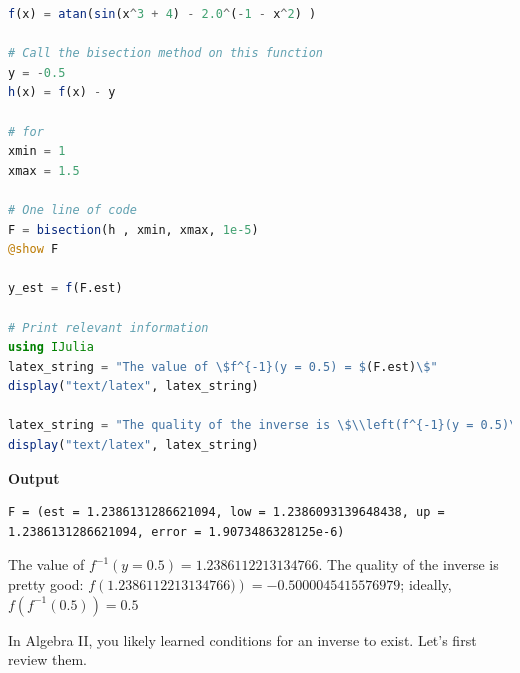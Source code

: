 \bigskip 

\begin{lstlisting}[language=Julia,style=mystyle]
f(x) = atan(sin(x^3 + 4) - 2.0^(-1 - x^2) )

# Call the bisection method on this function
y = -0.5
h(x) = f(x) - y

# for
xmin = 1
xmax = 1.5

# One line of code
F = bisection(h , xmin, xmax, 1e-5)
@show F

y_est = f(F.est)

# Print relevant information
using IJulia
latex_string = "The value of \$f^{-1}(y = 0.5) = $(F.est)\$"
display("text/latex", latex_string)

latex_string = "The quality of the inverse is \$\\left(f^{-1}(y = 0.5)\\right) = $(y_est)\$ is pretty good!"
display("text/latex", latex_string)
\end{lstlisting}
\textbf{Output} 
\begin{verbatim}
F = (est = 1.2386131286621094, low = 1.2386093139648438, up = 1.2386131286621094, error = 1.9073486328125e-6)
\end{verbatim}
The value of $f^{-1}(y = 0.5) = 1.2386112213134766$. The quality of the inverse is pretty good: $f\left(1.2386112213134766)\right) = -0.5000045415576979$; ideally, $f\left( f^{-1}(0.5) \right) = 0.5$ \\

\bigskip

In Algebra II, you likely learned conditions for an inverse to exist. Let's first review them. 

